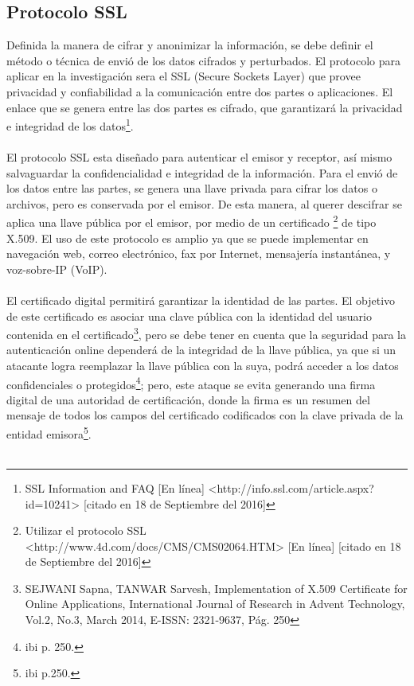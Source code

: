 \documentclass[a4paper,openright,12pt]{book}
\theoremstyle{definition}
\theoremstyle{remark}
\begin{document}
    \subsection{Protocolo SSL}
Definida la manera de cifrar y anonimizar la información, se debe definir el método o técnica de envió de los datos cifrados y perturbados. El protocolo para aplicar en la investigación sera el SSL (Secure Sockets Layer)  que provee privacidad y confiabilidad a la comunicación entre dos partes o aplicaciones. El enlace que se genera entre las dos partes es cifrado, que garantizará la privacidad e integridad de los datos\footnote{ SSL Information and FAQ [En línea] <http://info.ssl.com/article.aspx?id=10241> [citado en 18 de Septiembre del 2016]}.\\\\
El protocolo SSL esta diseñado para autenticar el emisor y receptor, así mismo salvaguardar la confidencialidad e integridad de la información. Para el envió de los datos entre las partes, se genera una llave privada para cifrar los datos o archivos, pero es conservada por el emisor. De esta manera, al querer descifrar se aplica una llave pública por el emisor, por medio de un certificado \footnote{Utilizar el protocolo SSL <http://www.4d.com/docs/CMS/CMS02064.HTM> [En línea] [citado en 18 de Septiembre del 2016]} de tipo X.509. El uso de este protocolo es amplio ya que se puede implementar en  navegación web, correo electrónico, fax por Internet, mensajería instantánea, y voz-sobre-IP (VoIP).\\\\
El certificado digital permitirá garantizar la identidad de las partes. El objetivo de este certificado es asociar una clave pública con la identidad del usuario contenida en el certificado\footnote{SEJWANI Sapna, TANWAR Sarvesh, Implementation of X.509 Certificate for Online Applications, International Journal of Research in Advent Technology, Vol.2, No.3, March 2014, E-ISSN: 2321-9637, Pág. 250}, pero se debe tener en cuenta que la seguridad para la autenticación online dependerá de la integridad de la llave pública, ya que si un atacante logra reemplazar la llave pública con la suya, podrá acceder a los datos confidenciales o protegidos\footnote{ibi p. 250.}; pero, este ataque se evita generando una firma digital de una autoridad de certificación, donde la firma es un resumen del mensaje de todos los campos del certificado codificados con la clave privada de la entidad emisora\footnote{ibi p.250.}.\\\\
\end{document}
